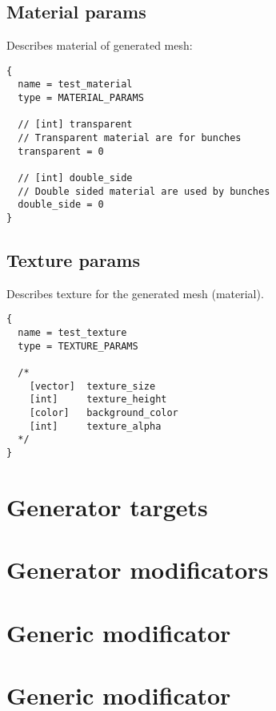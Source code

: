 \documentclass[11pt]{article}
\begin{document}
\subsection{Material params}

Describes material of generated mesh:

\begin{verbatim}
{
  name = test_material
  type = MATERIAL_PARAMS
  
  // [int] transparent
  // Transparent material are for bunches
  transparent = 0
  
  // [int] double_side
  // Double sided material are used by bunches
  double_side = 0  
}
\end{verbatim}

\subsection{Texture params}

Describes texture for the generated mesh (material).

\begin{verbatim}
{
  name = test_texture
  type = TEXTURE_PARAMS

  /*
    [vector]  texture_size
    [int]     texture_height
    [color]   background_color
    [int]     texture_alpha
  */
}
\end{verbatim}

\section{Generator targets}

\section{Generator modificators}
  
\section{Generic modificator}
  
\section{Generic modificator}
\end{document}
